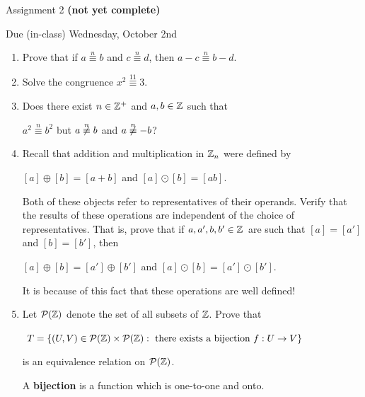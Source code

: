 \documentclass[11pt,fleqn,dvipsnames,usenames]{article}
\renewcommand{\headrulewidth}{1pt}
\newcommand{\p}{\noindent}
\begin{document}
\fancyhead[L]{\course}
\fancyhead[R]{\term}
\renewcommand{\headrulewidth}{0.4pt}

\begin{center}
{\huge Assignment 2 \textbf{(not yet complete)}}
\vsp

{\large Due (in-class) Wednesday, October 2nd}
\end{center}

\begin{enumerate}
\item Prove that if $a\overset{n}{\equiv}b$ and $c\overset{n}{\equiv}d$, then $a-c\overset{n}{\equiv}b-d$.
\item Solve the congruence $x^2\overset{11}{\equiv}3$.
\item Does there exist $n\in\mathbb{Z}^{+}$ and $a,b\in\mathbb{Z}$ such that
\begin{center}
$a^2\overset{n}{\equiv}b^2$ but $a\not\overset{n}{\equiv}b$ and $a\not\overset{n}{\equiv}-b$?
\end{center}
\item Recall that addition and multiplication in $\mathbb{Z}_n$ were defined by
\begin{center}
$[a] \oplus [b] = [a + b]$ and $[a]\odot [b] = [ab]$.
\end{center}
\p Both of these objects refer to representatives of their operands.  Verify that the results of these operations are independent of the choice of representatives.  That is, prove that if $a,a',b,b'\in\mathbb{Z}$ are such that $[a] = [a']$ and $[b] = [b']$, then
\begin{center}
$[a]\oplus [b] = [a']\oplus [b']$ and $[a]\odot [b] = [a']\odot [b']$.
\end{center}

\note It is because of this fact that these operations are well defined!

\item Let $\mathcal{P}(\mathbb{Z})$ denote the set of all subsets of $\mathbb{Z}$.  Prove that
\begin{center}
$T = \left\{(U,V)\in \mathcal{P}(\mathbb{Z})\times\mathcal{P}(\mathbb{Z}):\text{ there exists a bijection }f:U\to V\right\}$
\end{center}
is an equivalence relation on $\mathcal{P}(\mathbb{Z})$.
\vsmsp

\recall A \textbf{bijection} is a function which is one-to-one and onto.
\end{enumerate}
\vsmsp
\end{document}
